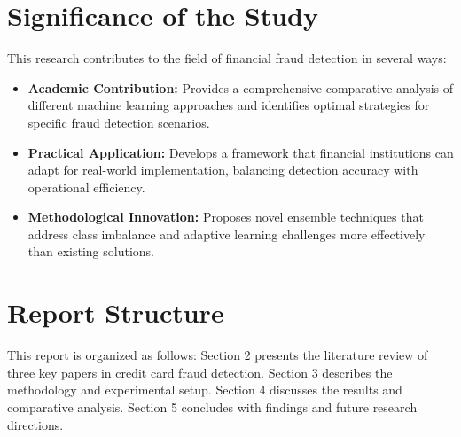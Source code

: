\section{Significance of the Study}

This research contributes to the field of financial fraud detection in several ways:

\begin{itemize}
\item \textbf{Academic Contribution:} Provides a comprehensive comparative analysis of different machine learning approaches and identifies optimal strategies for specific fraud detection scenarios.
    
\item \textbf{Practical Application:} Develops a framework that financial institutions can adapt for real-world implementation, balancing detection accuracy with operational efficiency.
    
\item \textbf{Methodological Innovation:} Proposes novel ensemble techniques that address class imbalance and adaptive learning challenges more effectively than existing solutions.
\end{itemize}

\section{Report Structure}

This report is organized as follows: Section 2 presents the literature review of three key papers in credit card fraud detection. Section 3 describes the methodology and experimental setup. Section 4 discusses the results and comparative analysis. Section 5 concludes with findings and future research directions.